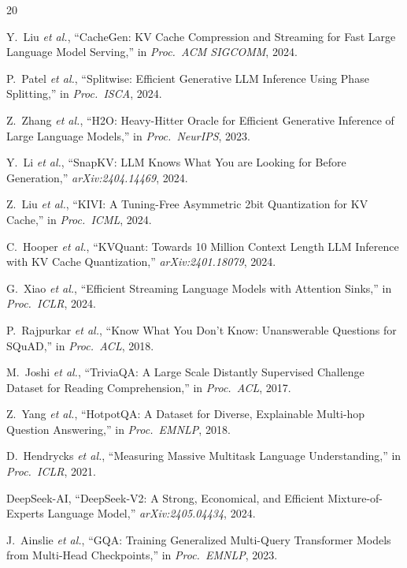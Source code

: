 \documentclass[conference]{IEEEtran}
\newcommand{\etal}{\textit{et al.}\xspace}
\begin{document}

\begin{thebibliography}{20}

Y.~Liu \etal, ``CacheGen: KV Cache Compression and Streaming for Fast Large Language Model Serving,'' in \emph{Proc.\ ACM SIGCOMM}, 2024.

P.~Patel \etal, ``Splitwise: Efficient Generative LLM Inference Using Phase Splitting,'' in \emph{Proc.\ ISCA}, 2024.

Z.~Zhang \etal, ``H2O: Heavy-Hitter Oracle for Efficient Generative Inference of Large Language Models,'' in \emph{Proc.\ NeurIPS}, 2023.

Y.~Li \etal, ``SnapKV: LLM Knows What You are Looking for Before Generation,'' \emph{arXiv:2404.14469}, 2024.

Z.~Liu \etal, ``KIVI: A Tuning-Free Asymmetric 2bit Quantization for KV Cache,'' in \emph{Proc.\ ICML}, 2024.

C.~Hooper \etal, ``KVQuant: Towards 10 Million Context Length LLM Inference with KV Cache Quantization,'' \emph{arXiv:2401.18079}, 2024.

G.~Xiao \etal, ``Efficient Streaming Language Models with Attention Sinks,'' in \emph{Proc.\ ICLR}, 2024.

P.~Rajpurkar \etal, ``Know What You Don't Know: Unanswerable Questions for SQuAD,'' in \emph{Proc.\ ACL}, 2018.

M.~Joshi \etal, ``TriviaQA: A Large Scale Distantly Supervised Challenge Dataset for Reading Comprehension,'' in \emph{Proc.\ ACL}, 2017.

Z.~Yang \etal, ``HotpotQA: A Dataset for Diverse, Explainable Multi-hop Question Answering,'' in \emph{Proc.\ EMNLP}, 2018.

D.~Hendrycks \etal, ``Measuring Massive Multitask Language Understanding,'' in \emph{Proc.\ ICLR}, 2021.

DeepSeek-AI, ``DeepSeek-V2: A Strong, Economical, and Efficient Mixture-of-Experts Language Model,'' \emph{arXiv:2405.04434}, 2024.

J.~Ainslie \etal, ``GQA: Training Generalized Multi-Query Transformer Models from Multi-Head Checkpoints,'' in \emph{Proc.\ EMNLP}, 2023.


\end{thebibliography}
\end{document}
